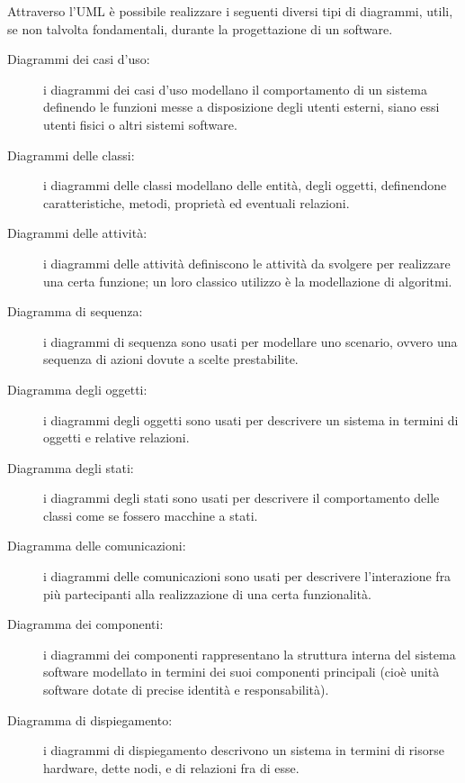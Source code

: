 Attraverso l'UML è possibile realizzare i seguenti diversi tipi di diagrammi, utili, se non talvolta fondamentali, durante la progettazione di un software.
\begin{description}
\item[Diagrammi dei casi d'uso:] i diagrammi dei casi d'uso modellano il comportamento di un sistema definendo le funzioni messe a disposizione degli utenti esterni, siano essi utenti fisici o altri sistemi software.
\item[Diagrammi delle classi:] i diagrammi delle classi modellano delle entità, degli oggetti, definendone caratteristiche, metodi, proprietà ed eventuali relazioni.
\item[Diagrammi delle attività:] i diagrammi delle attività definiscono le attività da svolgere per realizzare una certa funzione; un loro classico utilizzo è la modellazione di algoritmi.
\item[Diagramma di sequenza:] i diagrammi di sequenza sono usati per modellare uno scenario, ovvero una sequenza di azioni dovute a scelte prestabilite.
\item[Diagramma degli oggetti:] i diagrammi degli oggetti sono usati per descrivere un sistema in termini di oggetti e relative relazioni.
\item[Diagramma degli stati:] i diagrammi degli stati sono usati per descrivere il comportamento delle classi come se fossero macchine a stati.
\item[Diagramma delle comunicazioni:] i diagrammi delle comunicazioni sono usati per descrivere l'interazione fra più partecipanti alla realizzazione di una certa funzionalità.
\item[Diagramma dei componenti:] i diagrammi dei componenti rappresentano la struttura interna del sistema software modellato in termini dei suoi componenti principali (cioè unità software dotate di precise identità e responsabilità).
\item[Diagramma di dispiegamento:] i diagrammi di dispiegamento descrivono un sistema in termini di risorse hardware, dette nodi, e di relazioni fra di esse.
\end{description}
